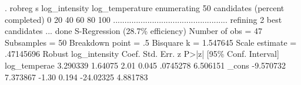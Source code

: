 . robreg s log_intensity log_temperature
{\smallskip}
enumerating 50 candidates (percent completed)
0  20  40  60  80  100
..................................................
{\smallskip}
refining 2 best candidates ... done
{\smallskip}
S-Regression (28.7\% efficiency)                 Number of obs     =         47
                                                  Subsamples      =         50
                                                  Breakdown point =         .5
                                                  Bisquare k      =   1.547645
                                                  Scale estimate  =  .47145696
{\smallskip}
              {\VBAR}               Robust
log_intensity {\VBAR}      Coef.   Std. Err.      z    P>|z|     [95\% Conf. Interval]
log_tempera{\tytilde}e {\VBAR}   3.290339    1.64075     2.01   0.045     .0745278    6.506151
        _cons {\VBAR}  -9.570732   7.373867    -1.30   0.194    -24.02325    4.881783
{\smallskip}
